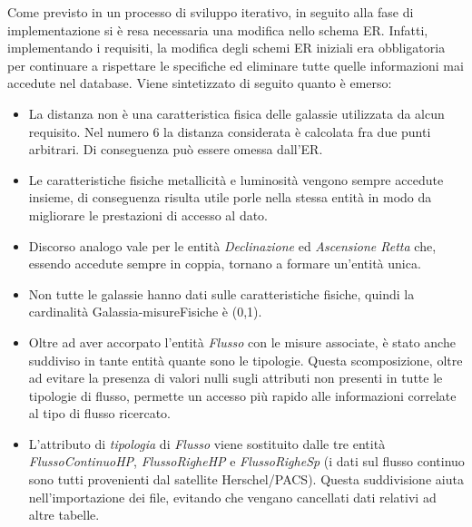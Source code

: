 \documentclass[12pt,a4paper,onecolumn,x11names]{article}
\begin{document}
\newpage
		\begin{flushleft}
			Come previsto in un processo di sviluppo iterativo, in seguito alla fase di implementazione si è resa necessaria una modifica nello schema ER. \newline
			Infatti, implementando i requisiti, la modifica degli schemi ER iniziali era obbligatoria per continuare a rispettare le specifiche ed eliminare tutte quelle informazioni mai accedute nel database.
			Viene sintetizzato di seguito quanto è emerso:
			\begin{itemize}
				\item La distanza non è una caratteristica fisica delle galassie utilizzata da alcun requisito. Nel numero 6 la distanza considerata è calcolata fra due punti arbitrari. Di conseguenza può essere omessa dall'ER. 
				\item Le caratteristiche fisiche metallicità e luminosità vengono sempre accedute insieme, di conseguenza risulta utile porle nella stessa entità in modo da migliorare le prestazioni di accesso al dato.
				\item Discorso analogo vale per le entità \textit{Declinazione} ed \textit{Ascensione Retta} che, essendo accedute sempre in coppia, tornano a formare un'entità unica.
				\item Non tutte le galassie hanno dati sulle caratteristiche fisiche, quindi la cardinalità Galassia-misureFisiche è (0,1).
				\item Oltre ad aver accorpato l'entità \textit{Flusso} con le misure associate, è stato anche suddiviso in tante entità quante sono le tipologie. Questa scomposizione, oltre ad evitare la presenza di valori nulli sugli attributi non presenti in tutte le tipologie di flusso, permette un accesso più rapido alle informazioni correlate al tipo di flusso ricercato.
				\item L'attributo di \textit{tipologia} di \textit{Flusso} viene sostituito dalle tre entità \textit{FlussoContinuoHP}, \textit{FlussoRigheHP} e \textit{FlussoRigheSp} (i dati sul flusso continuo sono tutti provenienti dal satellite Herschel/PACS). Questa suddivisione aiuta nell'importazione dei file, evitando che vengano cancellati dati relativi ad altre tabelle.
			\end{itemize}
		\end{flushleft}
	
\end{document}
